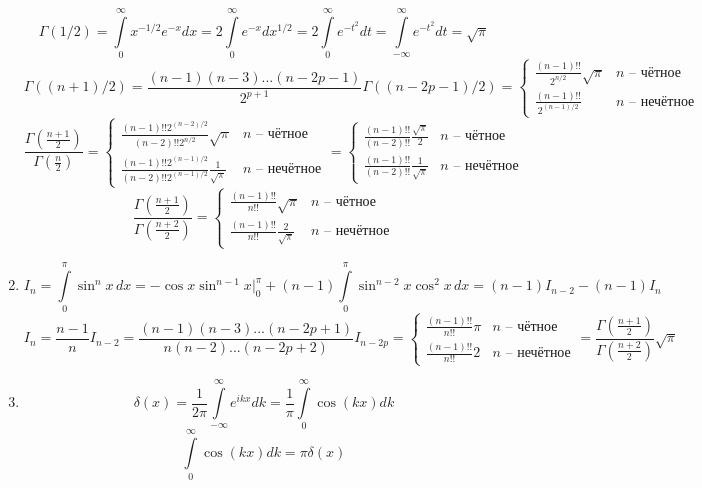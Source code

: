 \begin{enumerate}
	\[
		\Gamma(1/2) = \int\limits_0^\infty x^{-1/2} e^{-x} dx = 2 \int\limits_0^\infty e^{-x} dx^{1/2} =
		2 \int\limits_0^\infty e^{-t^2} dt = \int\limits_{-\infty}^\infty e^{-t^2} dt = \sqrt{\pi}
	\]
	\[
		\Gamma((n + 1)/2) = \frac{(n - 1)(n - 3)...(n - 2p - 1)}{2^{p+1}} \Gamma((n - 2p - 1)/2) =
		\begin{cases}
		\frac{(n - 1)!!}{2^{n/2}} \sqrt{\pi} & \text{$n$ -- чётное} \\
		\frac{(n - 1)!!}{2^{(n - 1)/2}} & \text{$n$ -- нечётное}
		\end{cases} 
	\]
	\[
		\frac{\Gamma\left(\frac{n + 1}{2}\right)}{\Gamma\left(\frac{n}{2}\right)}
		=
		\begin{cases}
		\frac{(n - 1)!! 2^{(n - 2)/2}}{(n - 2)!! 2^{n/2}} \sqrt{\pi} & \text{$n$ -- чётное} \\
		\frac{(n - 1)!! 2^{(n - 1)/2}}{(n - 2)!! 2^{(n - 1)/2}} \frac{1}{\sqrt{\pi}} & \text{$n$ -- нечётное}
		\end{cases}
		=
		\begin{cases}
		\frac{(n - 1)!!}{(n - 2)!!} \frac{\sqrt{\pi}}{2} & \text{$n$ -- чётное} \\
		\frac{(n - 1)!!}{(n - 2)!!} \frac{1}{\sqrt{\pi}} & \text{$n$ -- нечётное}
		\end{cases}
	\]
	\[
		\frac{\Gamma\left(\frac{n + 1}{2}\right)}{\Gamma\left(\frac{n + 2}{2}\right)}
		=
		\begin{cases}
		\frac{(n - 1)!!}{n!!} \sqrt{\pi} & \text{$n$ -- чётное} \\
		\frac{(n - 1)!!}{n!!} \frac{2}{\sqrt{\pi}} & \text{$n$ -- нечётное}
		\end{cases}
	\]
	\item
	\[
		I_n = \int\limits_0^\pi \sin^n x \, dx = - \cos x \sin^{n - 1} x \Big|_0^\pi + (n - 1) \int\limits_0^\pi \sin^{n - 2} x \cos^2 x \, dx = 
		(n - 1) I_{n - 2} - (n - 1) I_n 
	\] 
	\[
		I_n = \frac{n - 1}{n} I_{n - 2} = \frac{(n - 1)(n - 3)...(n - 2p +  1)}{n(n - 2)...(n - 2p + 2)} I_{n - 2p} =
		\begin{cases}
		\frac{(n - 1)!!}{n!!} \pi  & \text{$n$ -- чётное}\\
		\frac{(n - 1)!!}{n!!} 2 & \text{$n$ -- нечётное}
		\end{cases}
		=
		\frac{\Gamma\left(\frac{n + 1}{2}\right)}{\Gamma\left(\frac{n + 2}{2}\right)} \sqrt{\pi}
	\]
	\item
	\[
		\delta(x) = \frac{1}{2\pi} \int\limits_{-\infty}^{\infty} e^{ikx} dk = \frac{1}{\pi} \int\limits_{0}^{\infty} \cos (kx) dk
	\]
	\[
		\int\limits_{0}^{\infty} \cos (kx) dk = \pi \delta(x)
\]
\end{enumerate}
